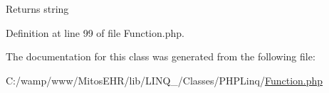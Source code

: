 \begin{DoxyReturn}{\-Returns}
string 
\end{DoxyReturn}


\-Definition at line 99 of file \-Function.\-php.




\-The documentation for this class was generated from the following file\-:\begin{DoxyCompactItemize}
\item 
\-C\-:/wamp/www/\-Mitos\-E\-H\-R/lib/\-L\-I\-N\-Q\-\_/\-Classes/\-P\-H\-P\-Linq/\hyperlink{_function_8php}{\-Function.\-php}\end{DoxyCompactItemize}
